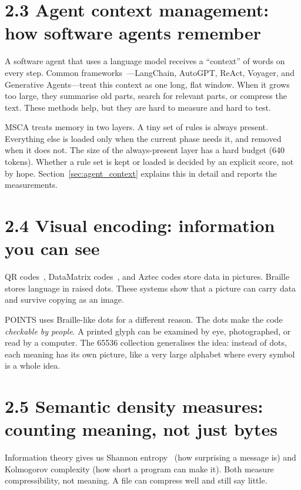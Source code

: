 \section*{2.3 Agent context management: how software agents remember}

A software agent that uses a language model receives a ``context'' of words on every step. Common frameworks~\cite{langchain2023,autogpt2023,yao2023react}---LangChain, AutoGPT, ReAct, Voyager, and Generative Agents---treat this context as one long, flat window. When it grows too large, they summarise old parts, search for relevant parts, or compress the text. These methods help, but they are hard to measure and hard to test.

MSCA treats memory in two layers. A tiny set of rules is always present. Everything else is loaded only when the current phase needs it, and removed when it does not. The size of the always-present layer has a hard budget (640 tokens). Whether a rule set is kept or loaded is decided by an explicit score, not by hope. Section~\ref{sec:agent_context} explains this in detail and reports the measurements.

\section*{2.4 Visual encoding: information you can see}

QR codes~\cite{qrcode1994}, DataMatrix codes~\cite{datamatrix1995}, and Aztec codes store data in pictures. Braille~\cite{braille1829} stores language in raised dots. These systems show that a picture can carry data and survive copying as an image.

POINTS uses Braille-like dots for a different reason. The dots make the code \textit{checkable by people}. A printed glyph can be examined by eye, photographed, or read by a computer. The 65536 collection generalises the idea: instead of dots, each meaning has its own picture, like a very large alphabet where every symbol is a whole idea.

\section*{2.5 Semantic density measures: counting meaning, not just bytes}

Information theory gives us Shannon entropy~\cite{shannon1948mathematical} (how surprising a message is) and Kolmogorov complexity (how short a program can make it). Both measure compressibility, not meaning. A file can compress well and still say little.


